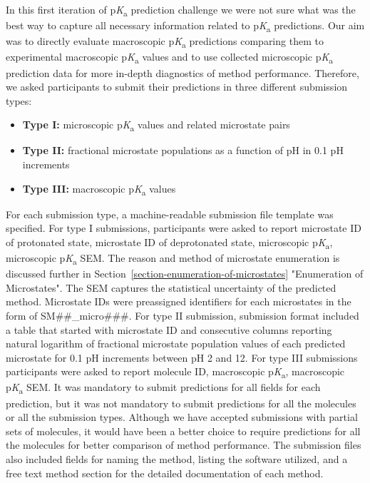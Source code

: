 \documentclass[9pt,lineno,final]{elife}
\newcommand{\pKa}{p\textit{K}\textsubscript{a}}
\begin{document}
In this first iteration of \pKa{} prediction challenge we were not sure what was the best way to capture all necessary information related to \pKa{} predictions. Our aim was to directly evaluate macroscopic \pKa{} predictions comparing them to experimental macroscopic \pKa{} values and to use collected microscopic \pKa{} prediction data for more in-depth diagnostics of method performance.
Therefore, we asked participants to submit their predictions in three different submission types: 
\begin{itemize}
\item {\bf Type I:} microscopic \pKa{} values and related microstate pairs
\item {\bf Type II:} fractional microstate populations as a function of pH in 0.1 pH increments
\item {\bf Type III:} macroscopic \pKa{} values
\end{itemize}

For each submission type, a machine-readable submission file template was specified. 
For type I submissions, participants were asked to report microstate ID of protonated state, microstate ID of deprotonated state, microscopic \pKa{}, microscopic \pKa{} SEM.  The reason and method of microstate enumeration is discussed further in Section~\ref{section-enumeration-of-microstates} "Enumeration of Microstates".
The SEM captures the statistical uncertainty of the predicted method. 
Microstate IDs were preassigned identifiers for each microstates in the form of SM\#\#\_micro\#\#\#. 
For type II submission, submission format included a table that started with microstate ID and consecutive columns reporting natural logarithm of fractional microstate population values of each predicted microstate for 0.1 pH increments between pH 2 and 12.
For type III submissions participants were asked to report molecule ID, macroscopic \pKa{}, macroscopic \pKa{} SEM.  
It was mandatory to submit predictions for all fields for each prediction, but it was not mandatory to submit predictions for all the molecules or all the submission types. 
Although we have accepted submissions with partial sets of molecules, it would have been a better choice to require predictions for all the  molecules for better comparison of method performance. 
The submission files also included fields for naming the method, listing the software utilized, and a free text method section for the detailed documentation of each method. 
\end{document}
